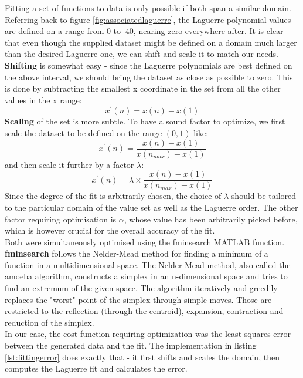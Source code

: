 \documentclass[a4paper]{article}
\numberwithin{equation}{section}
\begin{document}
Fitting a set of functions to data is only possible if both span a similar domain. Referring back to figure \ref{fig:associatedlaguerre}, the Laguerre polynomial values are defined on a range from $0$ to $~40$, nearing zero everywhere after. It is clear that even though the supplied dataset might be defined on a domain much larger than the desired Laguerre one, we can shift and scale it to match our needs. \\
\textbf{Shifting} is somewhat easy - since the Laguerre polynomials are best defined on the above interval, we should bring the dataset as close as possible to zero. This is done by subtracting the smallest x coordinate in the set from all the other values in the x range:
\begin{equation}
x^\prime(n) = x(n) - x(1)
\end{equation}
\textbf{Scaling} of the set is more subtle. To have a sound factor to optimize, we first scale the dataset to be defined on the range $(0,1)$ like:
\begin{equation}
x^\prime(n) = \frac{x(n) - x(1)}{x(n_{max}) - x(1)}
\end{equation}
and then scale it further by a factor $\lambda$:
\begin{equation}
x^\prime(n) = \lambda \times \frac{x(n) - x(1)}{x(n_{max}) - x(1)}
\end{equation}
Since the degree of the fit is arbitrarily chosen, the choice of $\lambda$ should be tailored to the particular domain of the value set as well as the Laguerre order. The other factor requiring optimisation is $\alpha$, whose value has been arbitrarily picked before, which is however crucial for the overall accuracy of the fit. \\

\noindent Both were simultaneously optimised using the fminsearch MATLAB function. \textbf{fminsearch} follows the Nelder-Mead method for finding a minimum of a function in a multidimensional space. The Nelder-Mead method, also called the amoeba algorithm, constructs a simplex in an n-dimensional space and tries to find an extremum of the given space. The algorithm iteratively and greedily replaces the "worst" point of the simplex through simple moves. Those are restricted to the reflection (through the centroid), expansion, contraction and reduction of the simplex. \\

\noindent In our case, the cost function requiring optimization was the least-squares error between the generated data and the fit. The implementation in listing \ref{lst:fittingerror} does exactly that - it first shifts and scales the domain, then computes the Laguerre fit and calculates the error.
\end{document}
